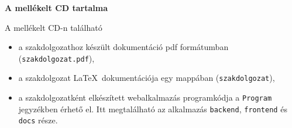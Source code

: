 \label{Chap:CD}
\pagestyle{empty}

\noindent \textbf{\Large A mellékelt CD tartalma}

\vskip 1cm

A mellékelt CD-n található

\begin{itemize}
\item a szakdolgozathoz készült dokumentáció pdf formátumban (\texttt{szakdolgozat.pdf}), 
\item a szakdolgozat \LaTeX \ dokumentációja egy mappában (\texttt{szakdolgozat}),
\item a szakdolgozatként elkészített webalkalmazás programkódja a \texttt{Program} jegyzékben érhető el. Itt megtalálható az alkalmazás \texttt{backend}, \texttt{frontend} és \texttt{docs} része.
\end{itemize}